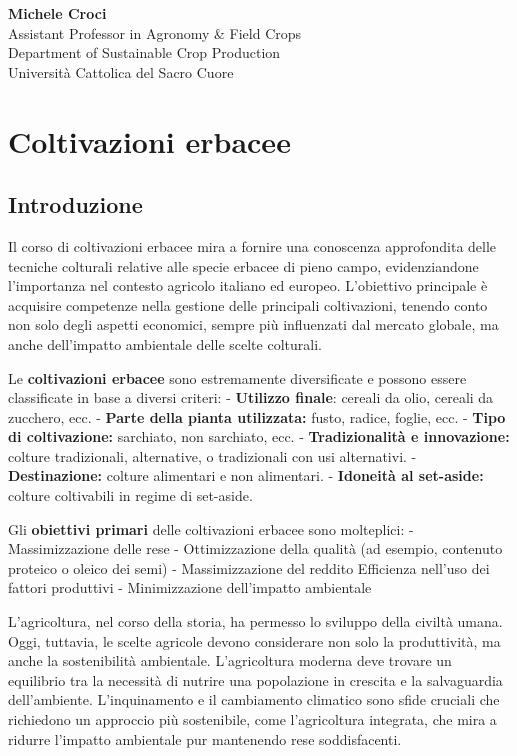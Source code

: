 \documentclass[
]{book}
\begin{document}
\textbf{Michele Croci}\\
Assistant Professor in Agronomy \& Field Crops\\
Department of Sustainable Crop Production\\
Università Cattolica del Sacro Cuore

\hypertarget{coltivazioni-erbacee}{%
\chapter{Coltivazioni erbacee}\label{coltivazioni-erbacee}}

\hypertarget{introduzione}{%
\section{Introduzione}\label{introduzione}}

Il corso di coltivazioni erbacee mira a fornire una conoscenza
approfondita delle tecniche colturali relative alle specie erbacee di
pieno campo, evidenziandone l'importanza nel contesto agricolo italiano
ed europeo. L'obiettivo principale è acquisire competenze nella gestione
delle principali coltivazioni, tenendo conto non solo degli aspetti
economici, sempre più influenzati dal mercato globale, ma anche
dell'impatto ambientale delle scelte colturali.

Le \textbf{coltivazioni erbacee} sono estremamente diversificate e
possono essere classificate in base a diversi criteri: -
\textbf{Utilizzo finale}: cereali da olio, cereali da zucchero, ecc. -
\textbf{Parte della pianta utilizzata:} fusto, radice, foglie, ecc. -
\textbf{Tipo di coltivazione:} sarchiato, non sarchiato, ecc. -
\textbf{Tradizionalità e innovazione:} colture tradizionali,
alternative, o tradizionali con usi alternativi. -
\textbf{Destinazione:} colture alimentari e non alimentari. -
\textbf{Idoneità al set-aside:} colture coltivabili in regime di
set-aside.

Gli \textbf{obiettivi primari} delle coltivazioni erbacee sono
molteplici: - Massimizzazione delle rese - Ottimizzazione della qualità
(ad esempio, contenuto proteico o oleico dei semi) - Massimizzazione del
reddito Efficienza nell'uso dei fattori produttivi - Minimizzazione
dell'impatto ambientale

L'agricoltura, nel corso della storia, ha permesso lo sviluppo della
civiltà umana. Oggi, tuttavia, le scelte agricole devono considerare non
solo la produttività, ma anche la sostenibilità ambientale.
L'agricoltura moderna deve trovare un equilibrio tra la necessità di
nutrire una popolazione in crescita e la salvaguardia dell'ambiente.
L'inquinamento e il cambiamento climatico sono sfide cruciali che
richiedono un approccio più sostenibile, come l'agricoltura integrata,
che mira a ridurre l'impatto ambientale pur mantenendo rese
soddisfacenti.
\end{document}

